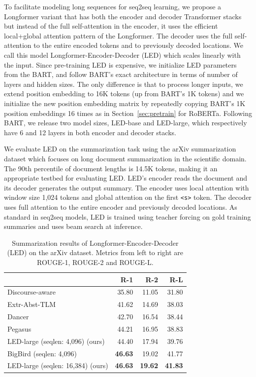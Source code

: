 \documentclass[11pt,a4paper]{article}
\begin{document}
To facilitate modeling long sequences for seq2seq learning, we propose a Longformer variant that has both the encoder and decoder Transformer stacks but instead of the full self-attention in the encoder, it uses the efficient local+global attention pattern of the Longformer.  The decoder uses the full self-attention to the entire encoded tokens and to previously decoded locations. We call this model Longformer-Encoder-Decoder (LED) which scales linearly with the input.
Since pre-training LED is expensive, we initialize LED parameters from the BART, and follow BART's exact architecture in terms of number of layers and hidden sizes. The only difference is that to process longer inputs, we extend position embedding to 16K tokens (up from BART's 1K tokens) and we initialize the new position embedding matrix by repeatedly copying BART's 1K position embeddings 16 times as in Section~\ref{sec:pretrain} for RoBERTa. Following BART, we release two model sizes, LED-base and LED-large, which respectively have 6 and 12 layers in both encoder and decoder stacks.

We evaluate LED on the summarization task using the arXiv summarization dataset \cite{arxiv2018} which focuses on long document summarization in the scientific domain. The 90th percentile of document lengths is 14.5K tokens, making it an appropriate testbed for evaluating LED. LED's encoder reads the document and its decoder generates the output summary. The encoder uses local attention with window size 1,024 tokens and global attention on the first \texttt{<s>} token. The decoder uses full attention to the entire encoder and previously decoded locations. As standard in seq2seq models, LED is trained using teacher forcing on gold training summaries and uses beam search at inference.

\begin{table}[]
\centering
\small
\begin{tabular}{@{}lrrr@{}}
\toprule
                & R-1   & R-2   & R-L   \\ \midrule
Discourse-aware \citeyearpar{arxiv2018} & 35.80 & 11.05 & 31.80 \\
Extr-Abst-TLM \citeyearpar{Subramanian2020OnEA}   & 41.62 & 14.69 & 38.03 \\
Dancer  \citeyearpar{Gidiotis2020ADA}        & 42.70 & 16.54 & 38.44 \\
Pegasus \citeyearpar{zhang2019pegasus}        & 44.21 & 16.95 & 38.83 \\ 
LED-large (seqlen: 4,096) (ours) &   44.40      &  17.94     & 39.76 \\
BigBird (seqlen: 4,096) \citeyearpar{Zaheer2020BigBT}        & \bf{46.63} & 19.02 & 41.77 \\
\hdashline[.4pt/1pt]
LED-large (seqlen: 16,384) (ours) & \bf{46.63}      &  \textbf{19.62}     & \bf{41.83}       \\ \bottomrule
\end{tabular}
\caption{Summarization results of Longformer-Encoder-Decoder (LED) on the arXiv dataset.  Metrics from left to right are ROUGE-1, ROUGE-2 and ROUGE-L.}\label{tab:summarization}
\end{table}
\end{document}
